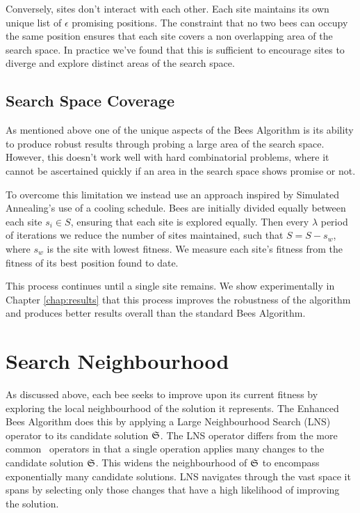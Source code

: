 Conversely, sites don't interact with each other. Each site maintains its own unique list of $\epsilon$ promising positions. The constraint that no two bees can occupy the same position ensures that each site covers a non overlapping area of the search space. In practice we've found that this is sufficient to encourage sites to diverge and explore distinct areas of the search space.    


\subsection{Search Space Coverage}
\label{subsec:searchspacecoverage}

As mentioned above one of the unique aspects of the Bees Algorithm is its ability to produce robust results through probing a large area of the search space. However, this doesn't work well with hard combinatorial problems, where it cannot be ascertained quickly if an area in the search space shows promise or not. 

To overcome this limitation we instead use an approach inspired by Simulated Annealing's use of a cooling schedule. Bees are initially divided equally between each site $s_i \in S$, ensuring that each site is explored equally. Then every $\lambda$ period of iterations we reduce the number of sites maintained, such that $S = S - s_w$, where $s_w$ is the site with lowest fitness. We measure each site's fitness from the fitness of its best position found to date.

This process continues until a single site remains. We show experimentally in Chapter \ref{chap:results} that this process improves the robustness of the algorithm and produces better results overall than the standard Bees Algorithm. 

\section{Search Neighbourhood}
\label{sec:searchneighbourhood}

As discussed above, each bee seeks to improve upon its current fitness by exploring the local neighbourhood of the solution it represents. The Enhanced Bees Algorithm does this by applying a Large Neighbourhood Search (LNS) operator to its candidate solution $\mathfrak{S}$. The LNS operator differs from the more common \VRP\ operators in that a single operation applies many changes to the candidate solution $\mathfrak{S}$. This widens the neighbourhood of $\mathfrak{S}$ to encompass exponentially many candidate solutions. LNS navigates through the vast space it spans by selecting only those changes that have a high likelihood of improving the solution.

